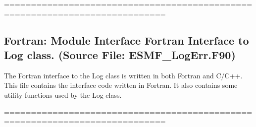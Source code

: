  
\setlength{\parskip}{0pt}
\setlength{\parindent}{0pt}
\setlength{\baselineskip}{11pt}
 
\def\bv{\begin{verbatim}}
\def\ev{\end{verbatim}}
\def\be{\begin{equation}}
\def\ee{\end{equation}}
\def\bea{\begin{eqnarray}}
\def\eea{\end{eqnarray}}
\def\bi{\begin{itemize}}
\def\ei{\end{itemize}}
\def\bn{\begin{enumerate}}
\def\en{\end{enumerate}}
\def\bd{\begin{description}}
\def\ed{\end{description}}
\def\({\left (}
\def\){\right )}
\def\[{\left [}
\def\]{\right ]}
\def\<{\left  \langle}
\def\>{\right \rangle}
\def\cI{{\cal I}}
\def\diag{\mathop{\rm diag}}
\def\tr{\mathop{\rm tr}}


 

  ============================================================================\subsection{Fortran:  Module Interface Fortran Interface to Log class.  (Source File: ESMF\_LogErr.F90)}


  
  
   The Fortran interface to the Log class is written in both Fortran and C/C++.
   This file contains the interface code written in Fortran.  It also contains
   some utility functions used by the Log class.
  
  ============================================================================
  
